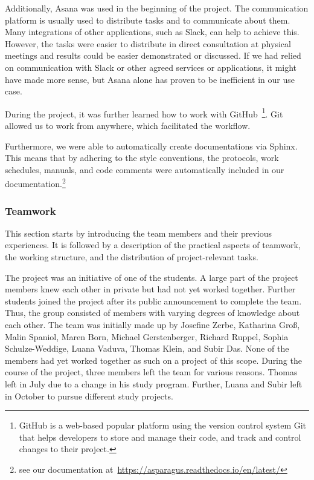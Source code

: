 Additionally, Asana was used in the beginning of the project. The communication platform is usually used to distribute tasks and to communicate about them. Many integrations of other applications, such as Slack, can help to achieve this. However, the tasks were easier to distribute in direct consultation at physical meetings and results could be easier demonstrated or discussed. If we had relied on communication with Slack or other agreed services or applications, it might have made more sense, but Asana alone has proven to be inefficient in our use case.

During the project, it was further learned how to work with GitHub~\footnote{GitHub is a web-based popular platform using the version control system Git that helps developers to store and manage their code, and track and control changes to their project.}. Git allowed us to work from anywhere, which facilitated the workflow.

Furthermore, we were able to automatically create documentations via Sphinx. This means that by adhering to the style conventions, the protocols, work schedules, manuals, and code comments were automatically included in our documentation.\footnote{see our documentation at~\url{https://asparagus.readthedocs.io/en/latest/}}


\subsubsection{Teamwork}
\label{subsec:Teamwork}

This section starts by introducing the team members and their previous experiences. It is followed by a description of the practical aspects of teamwork, the working structure, and the distribution of project-relevant tasks.

\bigskip
The project was an initiative of one of the students. A large part of the project members knew each other in private but had not yet worked together. Further students joined the project after its public announcement to complete the team. Thus, the group consisted of members with varying degrees of knowledge about each other. The team was initially made up by Josefine Zerbe, Katharina Groß, Malin Spaniol, Maren Born, Michael Gerstenberger, Richard Ruppel, Sophia Schulze-Weddige, Luana Vaduva, Thomas Klein, and Subir Das. None of the members had yet worked together as such on a project of this scope. During the course of the project, three members left the team for various reasons. Thomas left in July due to a change in his study program. Further, Luana and Subir left in October to pursue different study projects.

